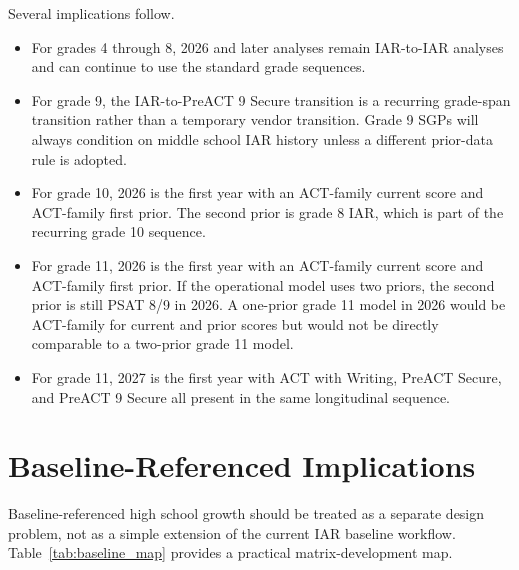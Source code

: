 \documentclass[11pt]{article}
\begin{document}
Several implications follow.

\begin{itemize}
\item For grades 4 through 8, 2026 and later analyses remain IAR-to-IAR analyses and can continue to use the standard grade sequences.
\item For grade 9, the IAR-to-PreACT 9 Secure transition is a recurring grade-span transition rather than a temporary vendor transition. Grade 9 SGPs will always condition on middle school IAR history unless a different prior-data rule is adopted.
\item For grade 10, 2026 is the first year with an ACT-family current score and ACT-family first prior. The second prior is grade 8 IAR, which is part of the recurring grade 10 sequence.
\item For grade 11, 2026 is the first year with an ACT-family current score and ACT-family first prior. If the operational model uses two priors, the second prior is still PSAT 8/9 in 2026. A one-prior grade 11 model in 2026 would be ACT-family for current and prior scores but would not be directly comparable to a two-prior grade 11 model.
\item For grade 11, 2027 is the first year with ACT with Writing, PreACT Secure, and PreACT 9 Secure all present in the same longitudinal sequence.
\end{itemize}

\section{Baseline-Referenced Implications}

Baseline-referenced high school growth should be treated as a separate design problem, not as a simple extension of the current IAR baseline workflow. Table~\ref{tab:baseline_map} provides a practical matrix-development map.
\end{document}
